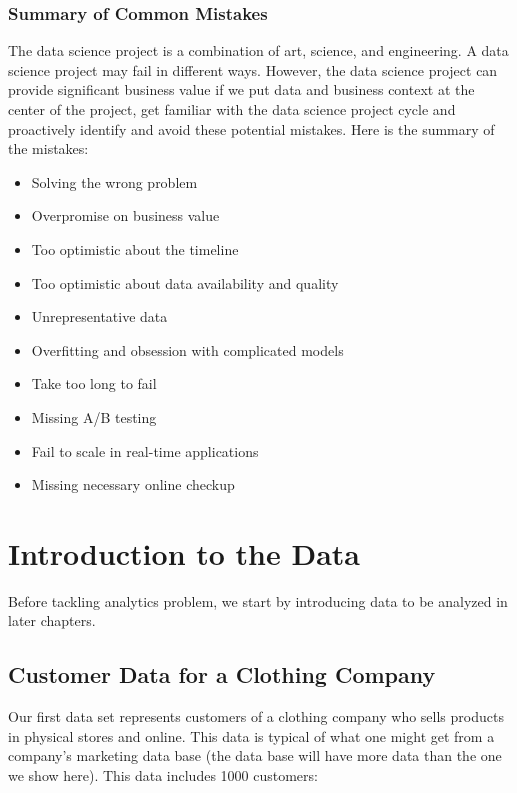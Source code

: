 \documentclass[
  12pt,
]{krantz}
\providecommand{\tightlist}{%
  \setlength{\itemsep}{0pt}\setlength{\parskip}{0pt}}
\begin{document}
\hypertarget{summary-of-common-mistakes}{%
\subsection{Summary of Common Mistakes}\label{summary-of-common-mistakes}}

The data science project is a combination of art, science, and engineering. A data science project may fail in different ways. However, the data science project can provide significant business value if we put data and business context at the center of the project, get familiar with the data science project cycle and proactively identify and avoid these potential mistakes. Here is the summary of the mistakes:

\begin{itemize}
\tightlist
\item
  Solving the wrong problem
\item
  Overpromise on business value
\item
  Too optimistic about the timeline
\item
  Too optimistic about data availability and quality
\item
  Unrepresentative data
\item
  Overfitting and obsession with complicated models
\item
  Take too long to fail
\item
  Missing A/B testing
\item
  Fail to scale in real-time applications
\item
  Missing necessary online checkup
\end{itemize}

\hypertarget{introduction-to-the-data}{%
\chapter{Introduction to the Data}\label{introduction-to-the-data}}

Before tackling analytics problem, we start by introducing data to be analyzed in later chapters.

\hypertarget{customer-data-for-a-clothing-company}{%
\section{Customer Data for a Clothing Company}\label{customer-data-for-a-clothing-company}}

Our first data set represents customers of a clothing company who sells products in physical stores and online. This data is typical of what one might get from a company's marketing data base (the data base will have more data than the one we show here). This data includes 1000 customers:
\end{document}
